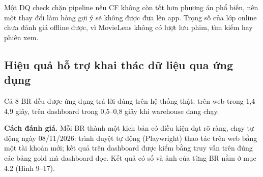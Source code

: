 \documentclass[a4paper,11pt]{article}
\begin{document}
Một DQ check chặn pipeline nếu CF không còn tốt hơn phương án phổ biến, nên một thay đổi làm hỏng gợi ý sẽ không được đưa lên app. Trọng số của lớp online chưa đánh giá offline được, vì MovieLens không có lượt lưu phim, tìm kiếm hay phiên xem.

\subsection{Hiệu quả hỗ trợ khai thác dữ liệu qua ứng dụng}\label{sec:5.4}

Cả 8 BR đều được ứng dụng trả lời đúng trên hệ thống thật: trên web trong 1,4--4,9 giây, trên dashboard trong 0,5--0,8 giây khi warehouse đang chạy.

\textbf{Cách đánh giá.} Mỗi BR thành một kịch bản có điều kiện \textquotedbl{}đạt\textquotedbl{} rõ ràng, chạy tự động ngày 08/11/2026: trình duyệt tự động (Playwright) thao tác trên web bằng một tài khoản mới; kết quả trên dashboard được kiểm bằng truy vấn trên đúng các bảng gold mà dashboard đọc. Kết quả có số và ảnh của từng BR nằm ở mục 4.2 (Hình 9--17).
\end{document}
